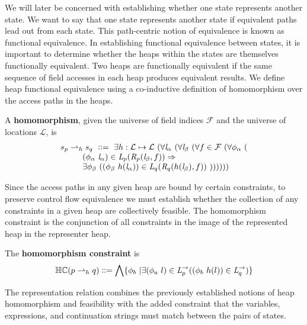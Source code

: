 We will later be concerned with establishing whether one state
represents another state. We want to say that one state represents
another state if equivalent paths lead out from each state. This
path-centric notion of equivalence is known as functional
equivalence. In establishing functional equivalence between states, it
is important to determine whether the heaps within the states are
themselves functionally equivalent. Two heaps are functionally
equivalent if the same sequence of field accesses in each heap
produces equivalent results. We define heap functional equivalence
using a co-inductive definition of homomorphism over the access paths
in the heaps.

\begin{definition}
\label{def:homomorphism}
A \textbf{homomorphism}, given the universe of field indices $\mathcal{F}$ and the universe of locations $\mathcal{L}$, is 
$$
\begin{array}{l}
 s_p \rightharpoonup_{h} s_q\ \defeq \ 
\exists h: \mathcal{L} \mapsto \mathcal{L}\ (\forall \cfgnt{l}_\alpha\ (\forall \cfgnt{l}_\beta\ (\forall f \in \mathcal{F}\ ( \forall \phi_\alpha\ (\\ 
\ \ \ \ \ \ \ \ (\phi_\alpha\ \cfgnt{l}_\alpha) \in \cfgnt{L}_p(\cfgnt{R}_p (\cfgnt{l}_\beta,f )) \Rightarrow \\
\ \ \ \ \ \ \ \ \exists \phi_\beta\ ( (\phi_\beta\ h(\cfgnt{l}_\alpha))\in \cfgnt{L}_q(\cfgnt{R}_q (h(\cfgnt{l}_\beta),f ))\ 
 )) ) ) ) )
\end{array}
$$
\end{definition}

Since the access paths in any given heap are bound by certain constraints, to preserve control flow equivalence we must establish whether the collection of any constraints in a given heap are collectively feasible. The homomorphism constraint is the conjunction of all constraints in the image of the represented heap in the representer heap.

\begin{definition}
\label{def:hc}
The \textbf{homomorphism constraint} is
\[
\mathbb{HC}(p \rightharpoonup_{h} q) \vcentcolon \vcentcolon=
\bigwedge \{ \phi_b\ | \exists (\phi_a\ l) \in \emph{L}_p^\rightarrow ( (\phi_b\ h(l)) \in \emph{L}_q^\rightarrow)\}
\]
\end{definition}


The representation relation combines the previously established
notions of heap homomorphism and feasibility with the added constraint
that the variables, expressions, and continuation strings must match
between the pairs of states.

